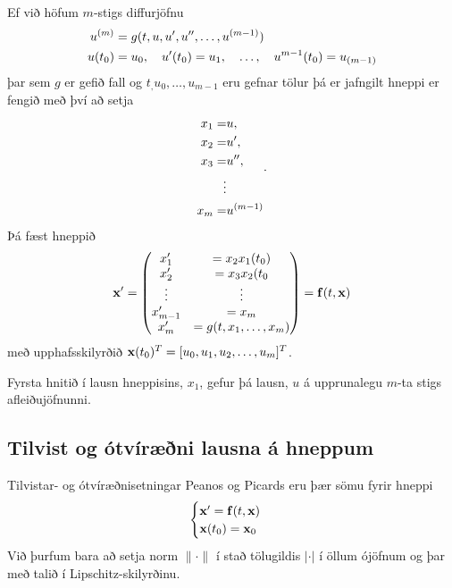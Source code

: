 \documentclass[letterpaper,10pt,icelandic]{sphinxmanual}
\begin{document}
Ef við höfum
\(m\)-stigs diffurjöfnu
\begin{gather}
\begin{split}\begin{aligned}
u^{(m)} &= g(t,u, u',u'',\ldots , u^{(m-1)})\\
u(t_0) &= u_0, \quad u'(t_0) = u_1, \quad \ldots, \quad  u^{m-1}(t_0) = u_{(m-1)}\end{aligned}\end{split}\notag
\end{gather}
þar sem \(g\) er gefið fall og \(t_, u_0, \ldots , u_{m-1}\) eru
gefnar tölur þá er jafngilt hneppi er fengið með því að setja
\begin{gather}
\begin{split}\begin{aligned}
x_1 =& u, \\
x_2 =& u', \\
x_3 =& u'', \\
\vdots& \\
x_m =& u^{(m-1)}\end{aligned}.\end{split}\notag
\end{gather}
Þá fæst hneppið
\begin{gather}
\begin{split}{\bf x}' =
\begin{pmatrix}
x_1' &= x_2 x_1(t_0) \\
x_2' &= x_3 x_2(t_0 \\
\vdots & \vdots\\
x_{m-1}' &= x_m \\
x_m' &= g(t,x_1, \ldots , x_m)
\end{pmatrix} =
{\bf f}(t,{\bf x})\end{split}\notag
\end{gather}
með upphafsskilyrðið \({\bf x}(t_0)^T = [u_0,u_1,u_2,\ldots,u_m]^T\).

Fyrsta hnitið í lausn hneppisins, \(x_1\), gefur þá lausn, \(u\)
á upprunalegu \(m\)-ta stigs afleiðujöfnunni.


\subsection{Tilvist og ótvíræðni lausna á hneppum}
\label{kafli06:tilvist-og-otviraeni-lausna-a-hneppum}
Tilvistar- og ótvíræðnisetningar Peanos og Picards eru þær sömu fyrir
hneppi
\begin{gather}
\begin{split}\begin{cases}
{\mbox{${\bf x}$}}' ={\mbox{${\bf f}$}}(t,{\mbox{${\bf x}$}})\\
{\mbox{${\bf x}$}}(t_0) = {\mbox{${\bf x}$}}_0
\end{cases}\end{split}\notag
\end{gather}
Við þurfum bara að setja norm \(\|\cdot\|\) í stað tölugildis
\(|\cdot|\) í öllum ójöfnum og þar með talið í Lipschitz-skilyrðinu.
\end{document}
